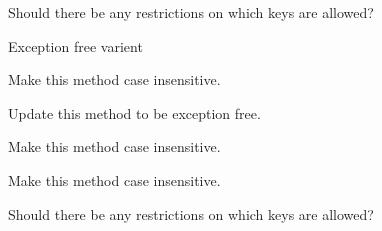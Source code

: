 \begin{DoxyRefList}
Should there be any restrictions on which keys are allowed? 

Exception free varient 
\item[\label{todo__todo000040}%
\hypertarget{todo__todo000040}{}%
Member \hyperlink{classwebsocketpp_1_1http_1_1parser_1_1parser_ae8a8f833c3fb01f1553a26e77f380367}{websocketpp\+:\+:http\+:\+:parser\+:\+:parser\+:\+:get\+\_\+header} (std\+::string const \&key) const]Make this method case insensitive. 
\item[\label{todo__todo000044}%
\hypertarget{todo__todo000044}{}%
Member \hyperlink{classwebsocketpp_1_1http_1_1parser_1_1parser_a4dbb443fd916f8b4306e7afdb2e8ff45}{websocketpp\+:\+:http\+:\+:parser\+:\+:parser\+:\+:process\+\_\+header} (std\+::string\+::iterator begin, std\+::string\+::iterator end)]Update this method to be exception free. 
\item[\label{todo__todo000043}%
\hypertarget{todo__todo000043}{}%
Member \hyperlink{classwebsocketpp_1_1http_1_1parser_1_1parser_a64ff49a6a1ddbf70b9767874ffdd513e}{websocketpp\+:\+:http\+:\+:parser\+:\+:parser\+:\+:remove\+\_\+header} (std\+::string const \&key)]Make this method case insensitive. 
\item[\label{todo__todo000042}%
\hypertarget{todo__todo000042}{}%
Member \hyperlink{classwebsocketpp_1_1http_1_1parser_1_1parser_aba2991b2aa41ca60d9427950502b0b93}{websocketpp\+:\+:http\+:\+:parser\+:\+:parser\+:\+:replace\+\_\+header} (std\+::string const \&key, std\+::string const \&val)]Make this method case insensitive. 

Should there be any restrictions on which keys are allowed? 


\end{DoxyRefList}
